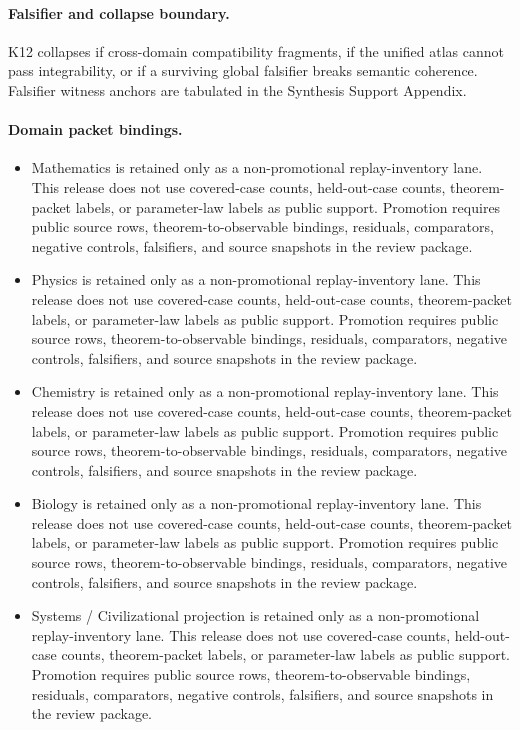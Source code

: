 \paragraph{Falsifier and collapse boundary.}
K12 collapses if cross-domain compatibility fragments, if the unified atlas cannot pass integrability, or if a surviving global falsifier breaks semantic coherence.
Falsifier witness anchors are tabulated in the Synthesis Support Appendix.

\paragraph{Domain packet bindings.}
\begin{itemize}[leftmargin=1.6em,nosep]
\item Mathematics is retained only as a non-promotional replay-inventory lane. This release does not use covered-case counts, held-out-case counts, theorem-packet labels, or parameter-law labels as public support. Promotion requires public source rows, theorem-to-observable bindings, residuals, comparators, negative controls, falsifiers, and source snapshots in the review package.
\item Physics is retained only as a non-promotional replay-inventory lane. This release does not use covered-case counts, held-out-case counts, theorem-packet labels, or parameter-law labels as public support. Promotion requires public source rows, theorem-to-observable bindings, residuals, comparators, negative controls, falsifiers, and source snapshots in the review package.
\item Chemistry is retained only as a non-promotional replay-inventory lane. This release does not use covered-case counts, held-out-case counts, theorem-packet labels, or parameter-law labels as public support. Promotion requires public source rows, theorem-to-observable bindings, residuals, comparators, negative controls, falsifiers, and source snapshots in the review package.
\item Biology is retained only as a non-promotional replay-inventory lane. This release does not use covered-case counts, held-out-case counts, theorem-packet labels, or parameter-law labels as public support. Promotion requires public source rows, theorem-to-observable bindings, residuals, comparators, negative controls, falsifiers, and source snapshots in the review package.
\item Systems / Civilizational projection is retained only as a non-promotional replay-inventory lane. This release does not use covered-case counts, held-out-case counts, theorem-packet labels, or parameter-law labels as public support. Promotion requires public source rows, theorem-to-observable bindings, residuals, comparators, negative controls, falsifiers, and source snapshots in the review package.

\end{itemize}
